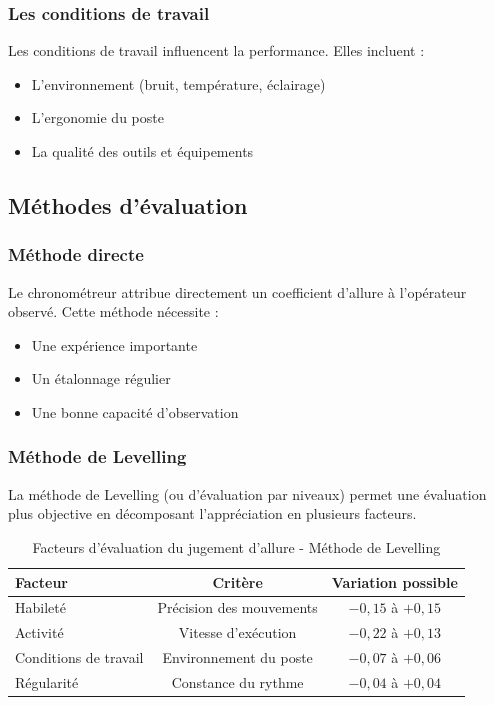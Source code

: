 \documentclass[a4paper,12pt]{article}
\begin{document}
\subsubsection{Les conditions de travail}

Les conditions de travail influencent la performance. Elles incluent :

\begin{itemize}
    \item L'environnement (bruit, température, éclairage)
    \item L'ergonomie du poste
    \item La qualité des outils et équipements
\end{itemize}

\subsection{Méthodes d'évaluation}

\subsubsection{Méthode directe}

Le chronométreur attribue directement un coefficient d'allure à l'opérateur observé. Cette méthode nécessite :

\begin{itemize}
    \item Une expérience importante
    \item Un étalonnage régulier
    \item Une bonne capacité d'observation
\end{itemize}

\subsubsection{Méthode de Levelling}

La méthode de Levelling (ou d'évaluation par niveaux) permet une évaluation plus objective en décomposant l'appréciation en plusieurs facteurs.

\begin{table}[ht]
\centering
\begin{tabular}{|l|c|c|}
\hline
\textbf{Facteur} & \textbf{Critère} & \textbf{Variation possible} \\
\hline
Habileté & Précision des mouvements & $-0,15$ à $+0,15$ \\
Activité & Vitesse d'exécution & $-0,22$ à $+0,13$ \\
Conditions de travail & Environnement du poste & $-0,07$ à $+0,06$ \\
Régularité & Constance du rythme & $-0,04$ à $+0,04$ \\
\hline
\end{tabular}
\caption{Facteurs d'évaluation du jugement d'allure - Méthode de Levelling}
\end{table}
\end{document}

